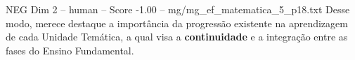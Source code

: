 \begin{textsample}{NEG Dim 2 – human – Score -1.00 – mg/mg\_ef\_matematica\_5\_p18.txt}  \label{ex:f2_neg_015}
Desse modo, merece destaque a importância da progressão existente na aprendizagem de cada Unidade Temática, a qual visa a \textbf{continuidade} e a integração entre as fases do Ensino Fundamental.

\end{textsample}
